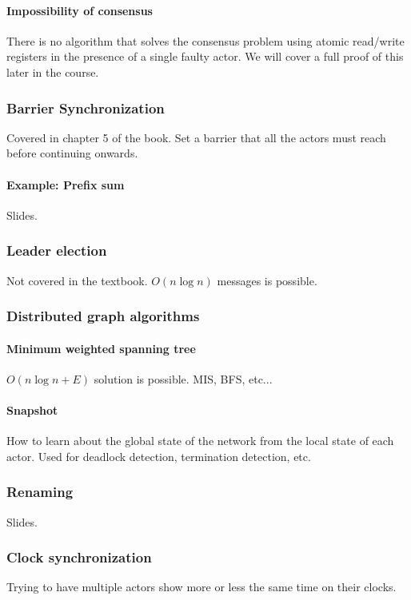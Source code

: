 \documentclass[a4paper]{article}
\begin{document}
\paragraph{Impossibility of consensus}
There is no algorithm that solves the consensus problem using atomic read/write registers in the presence of a single faulty actor. We will cover a full proof of this later in the course.

\subsubsection{Barrier Synchronization}
Covered in chapter 5 of the book.
Set a barrier that all the actors must reach before continuing onwards.

\paragraph{Example: Prefix sum}
Slides.

\subsubsection{Leader election}
Not covered in the textbook.
$O(n \log n)$ messages is possible.

\subsubsection{Distributed graph algorithms}

\paragraph{Minimum weighted spanning tree}
$O(n \log n + E)$ solution is possible. MIS, BFS, etc...

\paragraph{Snapshot}
How to learn about the global state of the network from the local state of each actor.
Used for deadlock detection, termination detection, etc.

\subsubsection{Renaming}
Slides.

\subsubsection{Clock synchronization}
Trying to have multiple actors show more or less the same time on their clocks.
\end{document}

